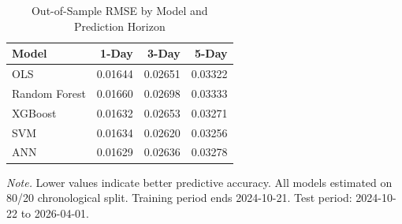 \begin{table}[!ht]
\centering
\begin{threeparttable}
\caption{Out-of-Sample RMSE by Model and Prediction Horizon}
\label{tab:eval_rmse}

\begin{tabular}{lrrr}
\toprule
Model & 1-Day & 3-Day & 5-Day\\
\midrule
OLS & 0.01644 & 0.02651 & 0.03322\\
Random Forest & 0.01660 & 0.02698 & 0.03333\\
XGBoost & 0.01632 & 0.02653 & 0.03271\\
SVM & 0.01634 & 0.02620 & 0.03256\\
ANN & 0.01629 & 0.02636 & 0.03278\\
\bottomrule
\end{tabular}
\begin{tablenotes}
\footnotesize
\item \textit{Note.} Lower values indicate better predictive accuracy. All models estimated on 80/20 chronological split. Training period ends 2024-10-21. Test period: 2024-10-22 to 2026-04-01.
\end{tablenotes}
\end{threeparttable}
\end{table}
